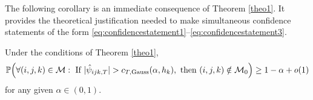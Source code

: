 \documentclass[a4paper,12pt]{article}
\numberwithin{equation}{section}
\begin{document}
The following corollary is an immediate consequence of Theorem \ref{theo1}. It provides the theoretical justification needed to make simultaneous confidence statements of the form \eqref{eq:confidencestatement1}--\eqref{eq:confidencestatement3}.


\begin{corollaryA}\label{corollary1}
Under the conditions of Theorem \ref{theo1}, 
\[ \mathbb{P}\Big( \forall (i,j,k) \in \mathcal{M}: \text{ If } |\hat{\psi}_{ijk,T}| > c_{T,\textnormal{Gauss}}(\alpha,h_k), \text{ then } (i,j,k) \notin \mathcal{M}_0 \Big) \ge 1 - \alpha + o(1) \]
for any given $\alpha \in (0,1)$.   
\end{corollaryA} 
\end{document}
